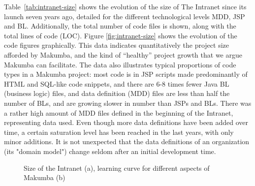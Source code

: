 \documentclass{llncs}
\begin{document}
Table~\ref{tab:intranet-size} shows the evolution of the size of The Intranet since its launch seven years ago, detailed for the different technological levels MDD, JSP and BL. Additionally, the total number of code files is shown, along with the total lines of code (LOC).  Figure \ref{fig:intranet-size} shows the evolution of the code figures graphically. This data indicates quantitatively the project size afforded by Makumba, and the kind of ``healthy'' project growth that we argue Makumba can facilitate. The data also illustrates typical proportions of code types in a Makumba project: most code is in JSP scripts made predominantly of HTML and SQL-like code snippets, and there are 6-8 times fewer Java BL (business logic) files, and data definition (MDD) files are less than half the number of BLs, and are growing slower in number than JSPs and BLs. There was a rather high amount of MDD files defined in the beginning of the Intranet, representing data used. Even though more data definitions have been added over time, a certain saturation level has been reached in the last years, with only minor additions. It is not unexpected that the data definitions of an organization (its "domain model") change seldom after an initial development time. 

\begin{figure}[t]
  	\centering
   \caption{Size of the Intranet (a), learning curve for different aspects of Makumba (b)}
\end{figure} 
\end{document}
